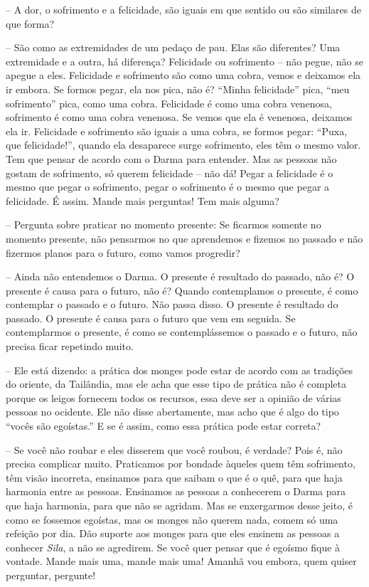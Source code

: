 -- A dor, o sofrimento e a felicidade, são iguais em que sentido ou
são similares de que forma?

-- São como as extremidades de um pedaço de pau. Elas são
diferentes? Uma extremidade e a outra, há diferença? Felicidade ou
sofrimento – não pegue, não se apegue a eles. Felicidade e sofrimento
são como uma cobra, vemos e deixamos ela ir embora. Se formos pegar,
ela nos pica, não é? “Minha felicidade” pica, “meu sofrimento” pica,
como uma cobra. Felicidade é como uma cobra venenosa, sofrimento é como
uma cobra venenosa. Se vemos que ela é venenosa, deixamos ela ir.
Felicidade e sofrimento são iguais a uma cobra, se formos pegar: “Puxa,
que felicidade!”, quando ela desaparece surge sofrimento, eles têm o
mesmo valor. Tem que pensar de acordo com o Darma para entender. Mas as
pessoas não gostam de sofrimento, só querem felicidade – não dá! Pegar
a felicidade é o mesmo que pegar o sofrimento, pegar o sofrimento é o
mesmo que pegar a felicidade. É assim. Mande mais perguntas! Tem mais
alguma?

-- Pergunta sobre praticar no momento presente: Se ficarmos somente
no momento presente, não pensarmos no que aprendemos e fizemos no
passado e não fizermos planos para o futuro, como vamos progredir?

-- Ainda não entendemos o Darma. O presente é resultado do passado,
não é? O presente é causa para o futuro, não é? Quando contemplamos o
presente, é como contemplar o passado e o futuro. Não passa disso. O
presente é resultado do passado. O presente é causa para o futuro que
vem em seguida. Se contemplarmos o presente, é como se contemplássemos
o passado e o futuro, não precisa ficar repetindo muito.

 -- Ele está dizendo: a prática dos monges pode
estar de acordo com as tradições do oriente, da Tailândia, mas ele acha
que esse tipo de prática não é completa porque os leigos fornecem todos
os recursos, essa deve ser a opinião de várias pessoas no ocidente. Ele
não disse abertamente, mas acho que é algo do tipo “vocês são
egoístas.” E se é assim, como essa prática pode estar correta?

-- Se você não roubar e eles disserem que você roubou, é verdade?
Pois é, não precisa complicar muito. Praticamos por bondade àqueles
quem têm sofrimento, têm visão incorreta, ensinamos para que saibam o
que é o quê, para que haja harmonia entre as pessoas. Ensinamos as
pessoas a conhecerem o Darma para que haja harmonia, para que não se
agridam. Mas se enxergarmos desse jeito, é como se fossemos egoístas,
mas os monges não querem nada, comem só uma refeição por dia. Dão
suporte aos monges para que eles ensinem as pessoas a conhecer
\emph{Sīla}, a não se agredirem. Se você quer pensar que é egoísmo
fique à vontade. Mande mais uma, mande mais uma! Amanhã vou embora,
quem quiser perguntar, pergunte!

